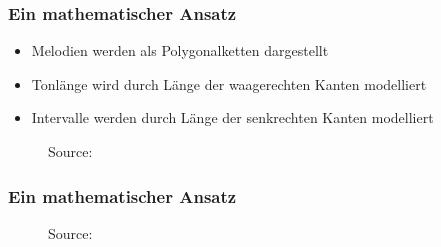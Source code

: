 \documentclass{beamer}
\begin{document}
	\begin{frame}
        \frametitle{Ein mathematischer Ansatz}
        \begin{minipage}{0.45\textwidth}
            \begin{itemize}
             \item Melodien werden als Polygonalketten dargestellt
             \item Tonlänge wird durch Länge der waagerechten Kanten modelliert
             \item Intervalle werden durch Länge der senkrechten Kanten modelliert 
            \end{itemize}
        \end{minipage}
        \begin{minipage}{0.45\textwidth}
        \begin{figure}[h!]
             \caption{Source: \cite{one}}
        \end{figure}
        \end{minipage}
	\end{frame}

	\begin{frame}
        \frametitle{Ein mathematischer Ansatz}
        \begin{figure}[h]
        \caption{Source: \cite{one}}
        \end{figure}
	\end{frame}
\end{document}
